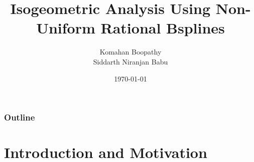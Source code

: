 \documentclass{beamer}
\title[\hspace{-0.2cm} Isogeometric Analysis Using NURBS]
{
  Isogeometric Analysis Using Non-Uniform Rational Bsplines
}
\author[ME6104 Project, K. Boopathy, S. Niranjan Babu, April 2019]
{
  \large {Komahan Boopathy}\\
  \large Siddarth Niranjan Babu \\
}
\institute
{
  \Large {\textbf{ME6104 Computer Aided Design -- Final Project}} \\
  \vspace{0.2in}
  \large Georgia Institute of Technology\\
  School of Aerospace Engineering
}
\date
{
\small \today
}
\begin{document}

\begin{frame}
  \titlepage
\end{frame}

\begin{frame}
  \frametitle{Outline}
  \tableofcontents
\end{frame}


\section{Introduction and Motivation}
\end{document}
